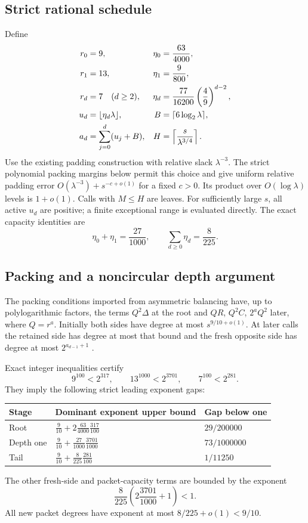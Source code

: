 \documentclass[11pt]{article}
\theoremstyle{remark}\newtheorem{remark}[theorem]{Remark}
\begin{document}
\subsection{Strict rational schedule}
Define
\begin{align}
 r_0&=9,& \eta_0&=\frac{63}{4000},\notag\\
 r_1&=13,& \eta_1&=\frac9{800},\notag\\
 r_d&=7\quad(d\ge2),&
 \eta_d&=\frac{77}{16200}\left(\frac49\right)^{d-2},\label{eq:schedule}\\
 u_d&=\lfloor\eta_d\lambda\rfloor,&
 B&=\lceil6\log_2\lambda\rceil,\notag\\
 a_d&=\sum_{j=0}^d(u_j+B),&
 H&=\left\lceil\frac{s}{\lambda^{3/4}}\right\rceil.\notag
\end{align}
Use the existing padding construction with relative slack $\lambda^{-3}$.
The strict polynomial packing margins below permit this choice and give
uniform relative padding error $O(\lambda^{-3})+s^{-c+o(1)}$ for a fixed
$c>0$. Its product over $O(\log\lambda)$ levels is $1+o(1)$.
Calls with $M\le H$ are leaves. For sufficiently large $s$, all active
$u_d$ are positive; a finite exceptional range is evaluated directly.
The exact capacity identities are
\begin{equation}
 \eta_0+\eta_1=\frac{27}{1000},\qquad
 \sum_{d\ge0}\eta_d=\frac8{225}.
 \label{eq:capacity}
\end{equation}

\subsection{Packing and a noncircular depth argument}
The packing conditions imported from asymmetric balancing have, up to
polylogarithmic factors, the terms $Q^2\Delta$ at the root and
$QR$, $Q^2C$, $2^aQ^2$ later, where $Q=r^a$. Initially both sides have
degree at most $s^{9/10+o(1)}$. At later calls the retained side has degree
at most that bound and the fresh opposite side has degree at most
$2^{a_{d-1}+1}$ \cite{asymmetric,adaptive,tree}.

Exact integer inequalities certify
\[
 9^{100}<2^{317},\qquad 13^{1000}<2^{3701},\qquad 7^{100}<2^{281}.
\]
They imply the following strict leading exponent gaps:
\begin{center}
\begin{tabular}{lll}
\toprule Stage & Dominant exponent upper bound & Gap below one\\\midrule
Root & $\frac9{10}+2\frac{63}{4000}\frac{317}{100}$ & $29/200000$\\
Depth one & $\frac9{10}+\frac{27}{1000}\frac{3701}{1000}$ & $73/1000000$\\
Tail & $\frac9{10}+\frac8{225}\frac{281}{100}$ & $1/11250$\\
\bottomrule
\end{tabular}
\end{center}
The other fresh-side and packet-capacity terms are bounded by the exponent
\[
 \frac8{225}\left(2\frac{3701}{1000}+1\right)<1.
\]
All new packet degrees have exponent at most $8/225+o(1)<9/10$.
\end{document}
